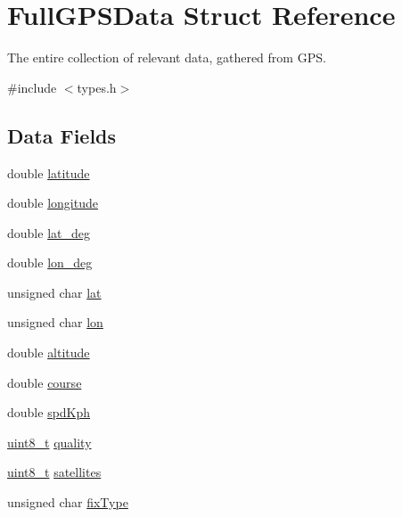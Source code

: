 \hypertarget{struct_full_g_p_s_data}{}\section{Full\+G\+P\+S\+Data Struct Reference}
\label{struct_full_g_p_s_data}


The entire collection of relevant data, gathered from G\+PS.  




{\ttfamily \#include $<$types.\+h$>$}

\subsection*{Data Fields}
\begin{DoxyCompactItemize}
\item 
double \hyperlink{struct_full_g_p_s_data_a76714bdbc5c536fa77dfb14533ff82a9}{latitude}
\item 
double \hyperlink{struct_full_g_p_s_data_ac155e35fdeebafc89723a51520fb9fe6}{longitude}
\item 
double \hyperlink{struct_full_g_p_s_data_ae0cc66619a6d2bc3c26c6835d1165478}{lat\+\_\+deg}
\item 
double \hyperlink{struct_full_g_p_s_data_acfc9eaa9c7495fe6c9d0dae65db238a0}{lon\+\_\+deg}
\item 
unsigned char \hyperlink{struct_full_g_p_s_data_a6a2e4ad53afd61fcd716002fc2965220}{lat}
\item 
unsigned char \hyperlink{struct_full_g_p_s_data_a7e55b80071251dcef4239e60122980a4}{lon}
\item 
double \hyperlink{struct_full_g_p_s_data_a2b13d276aee0d9fd646c8fa3647e869b}{altitude}
\item 
double \hyperlink{struct_full_g_p_s_data_acaa2fde7e3fad7df8f5755347603d17b}{course}
\item 
double \hyperlink{struct_full_g_p_s_data_acdf277ddb345fbdb7ef861a9c37c290e}{spd\+Kph}
\item 
\hyperlink{types_8h_aba7bc1797add20fe3efdf37ced1182c5}{uint8\+\_\+t} \hyperlink{struct_full_g_p_s_data_a0b48c8041be823080e6346c1731a54ed}{quality}
\item 
\hyperlink{types_8h_aba7bc1797add20fe3efdf37ced1182c5}{uint8\+\_\+t} \hyperlink{struct_full_g_p_s_data_aa306fbda3e6f642c3668c299361d25d0}{satellites}
\item 
unsigned char \hyperlink{struct_full_g_p_s_data_a4217a0a41f1bf0012de0dd9daa1b8dfc}{fix\+Type}
\item 

\end{DoxyCompactItemize}
